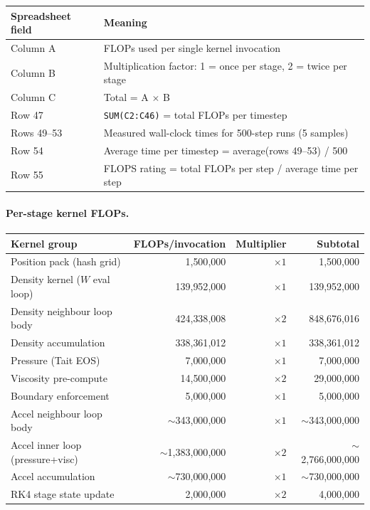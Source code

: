 \documentclass[11pt,a4paper]{article}
\begin{document}
\begin{center}
\begin{tabular}{ll}
  \toprule
  \textbf{Spreadsheet field} & \textbf{Meaning} \\
  \midrule
  Column A & FLOPs used per single kernel invocation \\
  Column B & Multiplication factor: 1 = once per stage, 2 = twice per stage \\
  Column C & Total = A $\times$ B \\
  Row 47 & \texttt{SUM(C2:C46)} = total FLOPs per timestep \\
  Rows 49--53 & Measured wall-clock times for 500-step runs (5 samples) \\
  Row 54 & Average time per timestep = average(rows 49--53) / 500 \\
  Row 55 & FLOPS rating = total FLOPs per step / average time per step \\
  \bottomrule
\end{tabular}
\end{center}

\paragraph{Per-stage kernel FLOPs.}
\begin{center}
{\footnotesize
\begin{tabularx}{\linewidth}{Xrrr}
  \toprule
  \textbf{Kernel group} & \textbf{FLOPs/invocation} & \textbf{Multiplier} & \textbf{Subtotal} \\
  \midrule
  Position pack (hash grid)        & 1{,}500{,}000     & $\times 1$ & 1{,}500{,}000 \\
  Density kernel ($W$ eval loop)   & 139{,}952{,}000   & $\times 1$ & 139{,}952{,}000 \\
  Density neighbour loop body      & 424{,}338{,}008   & $\times 2$ & 848{,}676{,}016 \\
  Density accumulation             & 338{,}361{,}012   & $\times 1$ & 338{,}361{,}012 \\
  Pressure (Tait EOS)              & 7{,}000{,}000     & $\times 1$ & 7{,}000{,}000 \\
  Viscosity pre-compute            & 14{,}500{,}000    & $\times 2$ & 29{,}000{,}000 \\
  Boundary enforcement             & 5{,}000{,}000     & $\times 1$ & 5{,}000{,}000 \\
  Accel neighbour loop body        & $\sim$343{,}000{,}000 & $\times 1$ & $\sim$343{,}000{,}000 \\
  Accel inner loop (pressure+visc) & $\sim$1{,}383{,}000{,}000 & $\times 2$ & $\sim$2{,}766{,}000{,}000 \\
  Accel accumulation               & $\sim$730{,}000{,}000 & $\times 1$ & $\sim$730{,}000{,}000 \\
  RK4 stage state update           & 2{,}000{,}000     & $\times 2$ & 4{,}000{,}000 \\
  \bottomrule
\end{tabularx}
}
\end{center}
\end{document}
